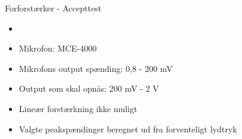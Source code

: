 \begin{frame}{Forforstærker - Accepttest}
\begin{itemize}
\item 
\item Mikrofon: MCE-4000
\item Mikrofons output spænding: 0,8 - 200 mV
\item Output som skal opnås: 200 mV - 2 V
\item Lineær forstærkning ikke muligt
\item Valgte peakspændinger beregnet ud fra forventeligt lydtryk
\end{itemize}
\end{frame}
